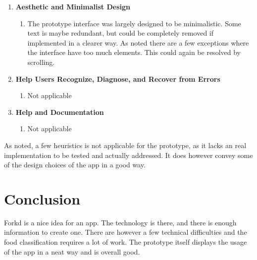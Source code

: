 \documentclass[12pt]{article}
\begin{document}
\begin{enumerate}
  \item \textbf{Aesthetic and Minimalist Design}
    \begin{enumerate}
      \item[] The prototype interface was largely designed to be minimalistic. Some text
        is maybe redundant, but could be completely removed if implemented in a
        clearer way. As noted there are a few exceptions where the interface
        have too much elements. This could again be resolved by scrolling.
    \end{enumerate}

  \item \textbf{Help Users Recognize, Diagnose, and Recover from Errors}
    \begin{enumerate}
      \item[] Not applicable
    \end{enumerate}

  \item \textbf{Help and Documentation}
    \begin{enumerate}
      \item[] Not applicable
    \end{enumerate}
\end{enumerate}

As noted, a few heuristics is not applicable for the prototype, as it lacks an
real implementation to be tested and actually addressed. It does however convey
some of the design choices of the app in a good way.


\section{Conclusion}
Forkd is a nice idea for an app. The technology is there, and there is enough
information to create one. There are however a few technical difficulties and
the food classification requires a lot of work. The prototype itself displays
the usage of the app in a neat way and is overall good.


\clearpage


\end{document}
